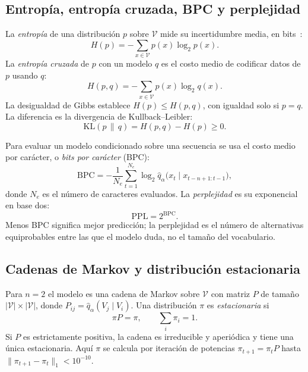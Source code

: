 \documentclass[11pt,letterpaper]{article}
\newcommand{\BPC}{\text{BPC}}
\newcommand{\PPL}{\text{PPL}}
\newcommand{\KL}{\text{KL}}
\begin{document}
\subsection{Entropía, entropía cruzada, BPC y perplejidad}

La \emph{entropía} de una distribución $p$ sobre $\mathcal{V}$ mide su incertidumbre media, en bits~\cite{shannon,cover}:
\begin{equation}\label{eq:entropia}
H(p)=-\sum_{x\in\mathcal{V}} p(x)\log_2 p(x).
\end{equation}
La \emph{entropía cruzada} de $p$ con un modelo $q$ es el costo medio de codificar datos de $p$ usando $q$:
\begin{equation}\label{eq:cruzada}
H(p,q)=-\sum_{x\in\mathcal{V}} p(x)\log_2 q(x).
\end{equation}
La desigualdad de Gibbs establece $H(p)\le H(p,q)$, con igualdad solo si $p=q$. La diferencia es la divergencia de Kullback--Leibler:
\begin{equation}\label{eq:kl}
\KL(p\,\|\,q)=H(p,q)-H(p)\ge 0.
\end{equation}

Para evaluar un modelo condicionado sobre una secuencia se usa el costo medio por carácter, o \emph{bits por carácter} (BPC):
\begin{equation}\label{eq:bpc}
\BPC=-\frac{1}{N_e}\sum_{t=1}^{N_e}\log_2 \hat q_\alpha\bigl(x_t\mid x_{t-n+1:t-1}\bigr),
\end{equation}
donde $N_e$ es el número de caracteres evaluados. La \emph{perplejidad} es su exponencial en base dos:
\begin{equation}\label{eq:ppl}
\PPL=2^{\BPC}.
\end{equation}
Menos BPC significa mejor predicción; la perplejidad es el número de alternativas equiprobables entre las que el modelo duda, no el tamaño del vocabulario.

\subsection{Cadenas de Markov y distribución estacionaria}

Para $n=2$ el modelo es una cadena de Markov sobre $\mathcal{V}$ con matriz $P$ de tamaño $|\mathcal{V}|\times|\mathcal{V}|$, donde $P_{ij}=\hat q_\alpha(V_j\mid V_i)$. Una distribución $\pi$ es \emph{estacionaria} si
\begin{equation}\label{eq:estacionaria}
\pi P=\pi,\qquad \sum_{i}\pi_i=1.
\end{equation}
Si $P$ es estrictamente positiva, la cadena es irreducible y aperiódica y tiene una única estacionaria. Aquí $\pi$ se calcula por iteración de potencias $\pi_{t+1}=\pi_tP$ hasta $\|\pi_{t+1}-\pi_t\|_1<10^{-10}$.
\end{document}
